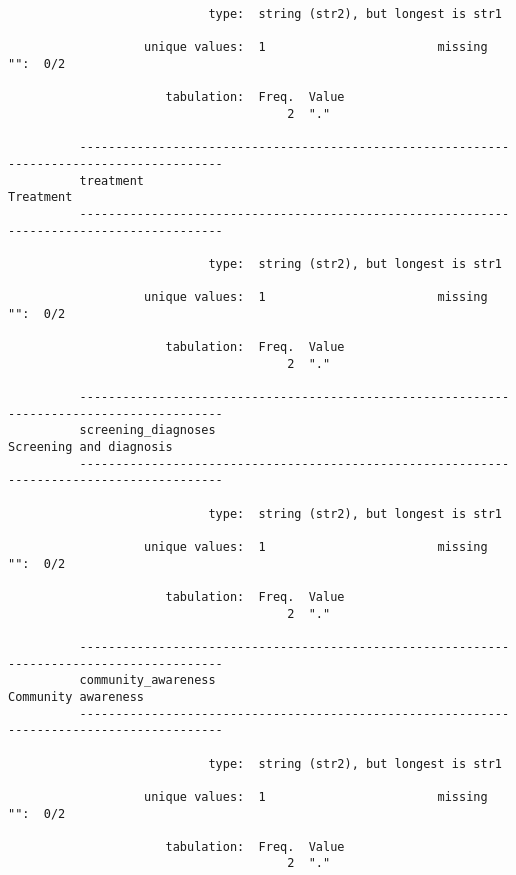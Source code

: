 \documentclass{article}
\begin{document}
\begin{verbatim}
                            type:  string (str2), but longest is str1
          
                   unique values:  1                        missing "":  0/2
          
                      tabulation:  Freq.  Value
                                       2  "."
          
          ------------------------------------------------------------------------------------------
          treatment                                                                        Treatment
          ------------------------------------------------------------------------------------------
          
                            type:  string (str2), but longest is str1
          
                   unique values:  1                        missing "":  0/2
          
                      tabulation:  Freq.  Value
                                       2  "."
          
          ------------------------------------------------------------------------------------------
          screening_diagnoses                                                Screening and diagnosis
          ------------------------------------------------------------------------------------------
          
                            type:  string (str2), but longest is str1
          
                   unique values:  1                        missing "":  0/2
          
                      tabulation:  Freq.  Value
                                       2  "."
          
          ------------------------------------------------------------------------------------------
          community_awareness                                                    Community awareness
          ------------------------------------------------------------------------------------------
          
                            type:  string (str2), but longest is str1
          
                   unique values:  1                        missing "":  0/2
          
                      tabulation:  Freq.  Value
                                       2  "."
          

\end{verbatim}
\end{document}
